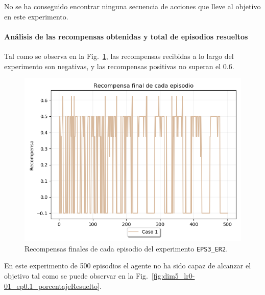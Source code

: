 No se ha conseguido encontrar ninguna secuencia de acciones que lleve al objetivo en este experimento. 

\paragraph{Análisis de las recompensas obtenidas y total de episodios resueltos} 

Tal como se observa en la Fig.~\ref{fig:dim5_lr0-01_ep0.1_recompensa}, las recompensas recibidas a lo largo del experimento son negativas, y las recompensas positivas no superan el 0.6.\\

\begin{figure}
    \centering
    \includegraphics[scale=0.4]{cap5_experimentacion/images/dim5_lr0-01_ep0.1_recompensa.png}
    \caption{Recompensas finales de cada episodio del experimento \texttt{EPS3\_ER2}.}
    \label{fig:dim5_lr0-01_ep0.1_recompensa}
\end{figure}

En este experimento de 500 episodios el agente no ha sido capaz de alcanzar el objetivo tal como se puede observar en la Fig.~\ref{fig:dim5_lr0-01_ep0.1_porcentajeResuelto}. 

